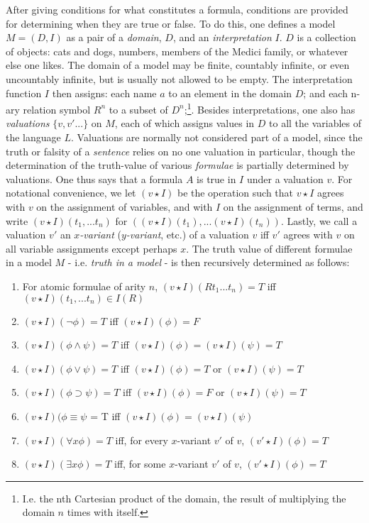 \documentclass[]{article}
\begin{document}
After giving conditions for what constitutes a formula, conditions are provided for determining when they are true or false. To do this, one defines a model $M = (D, I)$ as a pair of a \textit{domain}, $D$, and an \textit{interpretation} $I$. $D$ is  a collection of objects: cats and dogs, numbers, members of the Medici family, or whatever else one likes. The domain of a model may be finite, countably infinite, or even uncountably infinite, but is usually not allowed to be empty. The interpretation function $I$ then assigns: each name $a$ to an element in the domain $D$; and each n-ary relation symbol $R^{n}$ to a subset of $D^{n}$;\footnote{I.e. the nth Cartesian product of the domain, the result of multiplying the domain $n$ times with itself.}. Besides interpretations, one also has \textit{valuations} $\{v, v' ...\}$ on $M$, each of which assigns values in $D$ to all the variables of the language $L$. Valuations are normally not considered part of a model, since the truth or falsity of a \textit{sentence} relies on no one valuation in particular, though the determination of the truth-value of various \textit{formulae} is partially determined by valuations. One thus says that a formula $A$ is true in $I$ under a valuation $v$. For notational convenience, we let $(v \star I)$ be the operation such that $v \star I$ agrees with $v$ on the assignment of variables, and with $I$ on the assignment of terms, and write $(v \star I)(t_{1}, ...t_{n})$ for $((v \star I)(t_{1}), ... (v \star I)(t_{n}))$. Lastly, we call a valuation $v'$ an \textit{$x$-variant} (\textit{$y$-variant}, etc.) of a valuation $v$ iff $v'$ agrees with $v$ on all variable assignments except perhaps $x$. The truth value of different formulae in a model $M$ - i.e. \textit{truth in a model} - is then recursively determined as follows:

\begin{enumerate}
\item For atomic formulae of arity $n$, $(v \star I)(Rt_{1}...t_{n}) = T$ iff $(v \star I)(t_{1}, ... t_{n}) \in I(R)$
\item $(v \star I)(\neg\phi) = T$ iff $(v \star I)(\phi) = F$
\item $(v \star I)(\phi \wedge \psi) = T$ iff $(v \star I)(\phi) = (v \star I)(\psi) = T$
\item $(v \star I)(\phi \vee \psi) = T$ iff $(v \star I)(\phi) = T$ or $(v \star I)(\psi) = T$
\item $(v \star I)(\phi \supset \psi) = T$ iff $(v \star I)(\phi) = F$ or $(v \star I)(\psi) = T$
\item $(v \star I)(\phi \equiv \psi$ = T iff $(v \star I)(\phi) = (v \star I)(\psi)$
\item $(v \star I)(\forall x \phi) = T$ iff, for every $x$-variant $v'$ of $v$, $(v' \star I)(\phi) = T$
\item $(v \star I)(\exists x \phi) = T$ iff, for some $x$-variant $v'$ of $v$, $(v' \star I)(\phi) = T$
\end{enumerate}
\end{document}
